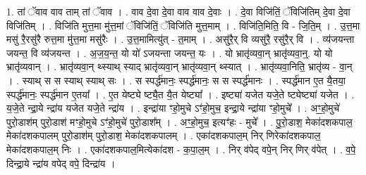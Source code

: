 \documentclass[17pt]{extarticle}
\begin{document}
1. तां ॅवाव वाव ताम् तां ॅवाव । . वाव दे॒वा दे॒वा वाव वाव दे॒वाः । . दे॒वा विजि॑तिं॒ ॅविजि॑तिम् दे॒वा दे॒वा विजि॑तिम् । . विजि॑ति मुत्त॒मा मु॑त्त॒मां ॅविजि॑तिं॒ ॅविजि॑ति मुत्त॒माम् । . विजि॑ति॒मिति॒ वि - जि॒ति॒म् । . उ॒त्त॒मा मसु॑ रै॒रसु॑रै रुत्त॒मा मु॑त्त॒मा मसु॑रैः । . उ॒त्त॒मामित्यु॑त् - त॒माम् । . असु॑रै॒र् वि व्यसु॑रै॒ रसु॑रै॒र् वि । . व्य॑जयन्ता जयन्त॒ वि व्य॑जयन्त । . अ॒ज॒य॒न्त॒ यो यो॑ ऽजयन्ता जयन्त॒ यः । . यो भ्रातृ॑व्यवा॒न् भ्रातृ॑व्यवा॒न्॒. यो यो भ्रातृ॑व्यवान् । . भ्रातृ॑व्यवा॒न् थ्स्याथ् स्याद् भ्रातृ॑व्यवा॒न् भ्रातृ॑व्यवा॒न् थ्स्यात् । . भ्रातृ॑व्यवा॒निति॒ भ्रातृ॑व्य - वा॒न् । . स्याथ् स स स्याथ् स्याथ् सः । . स स्पर्द्ध॑मानः॒ स्पर्द्ध॑मानः॒ स स स्पर्द्ध॑मानः । . स्पर्द्ध॑मान ए॒त यै॒तया॒ स्पर्द्ध॑मानः॒ स्पर्द्ध॑मान ए॒तया᳚ । . ए॒त येष्ट्ये ष्ट्यै॒त यै॒त येष्ट्या᳚ । . इष्ट्या॑ यजेत यजे॒ते ष्ट्येष्ट्या॑ यजेत । . य॒जे॒ते न्द्रा॒ये न्द्रा॑य यजेत यजे॒ते न्द्रा॑य । . इन्द्रा॑या ꣳहो॒मुचे ऽꣳ॑हो॒मुच॒ इन्द्रा॒ये न्द्रा॑या ꣳहो॒मुचे᳚ । . अꣳ॒॒हो॒मुचे॑ पुरो॒डाश॑म् पुरो॒डाश॑ मꣳहो॒मुचे ऽꣳ॑हो॒मुचे॑ पुरो॒डाश᳚म् । . अꣳ॒॒हो॒मुच॒ इत्यꣳ॑हः - मुचे᳚ । . पु॒रो॒डाश॒ मेका॑दशकपाल॒ मेका॑दशकपालम् पुरो॒डाश॑म् पुरो॒डाश॒ मेका॑दशकपालम् । . एका॑दशकपाल॒म् निर् णिरेका॑दशकपाल॒ मेका॑दशकपाल॒म् निः । . एका॑दशकपाल॒मित्येका॑दश - क॒पा॒ल॒म् । . निर् व॑पेद् वपे॒न् निर् णिर् व॑पेत् । . व॒पे॒ दिन्द्रा॒ये न्द्रा॑य वपेद् वपे॒ दिन्द्रा॑य । \newline
\end{document}
